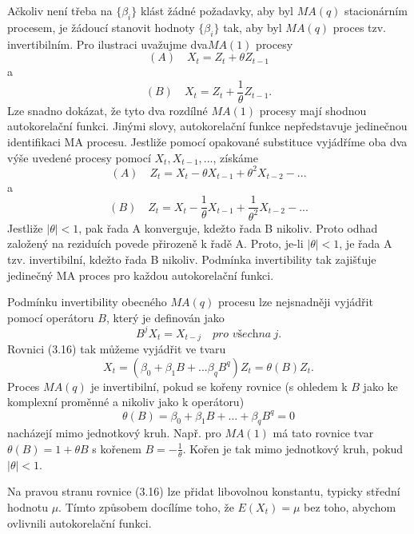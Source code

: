 Ačkoliv není třeba na $\{\beta_i\}$ klást žádné požadavky, aby byl $MA(q)$ stacionárním procesem, je žádoucí stanovit hodnoty $\{\beta_i\}$ tak, aby byl $MA(q)$ proces tzv. invertibilním. Pro ilustraci uvažujme dva$MA(1)$ procesy
\begin{equation}
(A) \quad X_t = Z_t + \theta Z_{t - 1}
\end{equation}
a
\begin{equation}
(B) \quad X_t = Z_t + \frac{1}{\theta}Z_{t - 1}.
\end{equation}
Lze snadno dokázat, že tyto dva rozdílné $MA(1)$ procesy mají shodnou autokorelační funkci. Jinými slovy, autokorelační funkce nepředstavuje jedinečnou identifikaci MA procesu. Jestliže pomocí opakované substituce vyjádříme oba dva výše uvedené procesy pomocí $X_t, X_{t - 1}, ...$, získáme
\begin{equation}
(A) \quad Z_t = X_t - \theta X_{t-1} + \theta^2 X_{t-2} - ...
\end{equation}
a
\begin{equation}
(B) \quad Z_t = X_t - \frac{1}{\theta}X_{t - 1} + \frac{1}{\theta^2}X_{t - 2} - ...
\end{equation}
Jestliže $|\theta| < 1$, pak řada A konverguje, kdežto řada B nikoliv. Proto odhad založený na reziduích povede přirozeně k řadě A. Proto, je-li $|\theta| < 1$, je řada A tzv. invertibilní, kdežto řada B nikoliv. Podmínka invertibility tak zajišťuje jedinečný MA proces pro každou autokorelační funkci.

Podmínku invertibility obecného $MA(q)$ procesu lze nejsnadněji vyjádřit pomocí operátoru $B$, který je definován jako
\begin{equation}
B^j X_t = X_{t - j} \quad \textit{pro všechna} ~ j.
\end{equation}
Rovnici (3.16) tak můžeme vyjádřit ve tvaru
\begin{equation}
X_t = (\beta_0 + \beta_1 B + ... \beta_q B^q)Z_t = \theta(B)Z_t.
\end{equation}
Proces $MA(q)$ je invertibilní, pokud se kořeny rovnice (s ohledem k $B$ jako ke komplexní proměnné a nikoliv jako k operátoru)
\begin{equation}
\theta(B) = \beta_0 + \beta_1 B + ... + \beta_q B^q = 0
\end{equation}
nacházejí mimo jednotkový kruh. Např. pro $MA(1)$ má tato rovnice tvar $\theta(B) = 1 + \theta B$ s kořenem $B = -\frac{1}{\theta}$. Kořen je tak mimo jednotkový kruh, pokud $|\theta| < 1$.

Na pravou stranu rovnice (3.16) lze přidat libovolnou konstantu, typicky střední hodnotu $\mu$. Tímto způsobem docílíme toho, že $E(X_t) = \mu$ bez toho, abychom ovlivnili autokorelační funkci.

